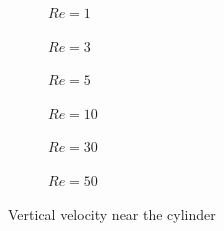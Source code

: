 \begin{figure}[h]
	\centering
	\begin{subfigure}{0.5\textwidth}
		\resizebox{1.1\textwidth}{!}{}
		\caption{$Re=1$}
	\end{subfigure}%
	\begin{subfigure}{0.5\textwidth}
		\resizebox{1.1\textwidth}{!}{}
		\caption{$Re=3$}
	\end{subfigure}
	\begin{subfigure}{0.5\textwidth}
		\resizebox{1.1\textwidth}{!}{}
		\caption{$Re=5$}
	\end{subfigure}%
	\begin{subfigure}{0.5\textwidth}
		\resizebox{1.1\textwidth}{!}{}
		\caption{$Re=10$}
	\end{subfigure}
	\begin{subfigure}{0.5\textwidth}
		\resizebox{1.1\textwidth}{!}{}
		\caption{$Re=30$}
	\end{subfigure}%
	\begin{subfigure}{0.5\textwidth}
		\resizebox{1.1\textwidth}{!}{}
		\caption{$Re=50$}
	\end{subfigure}
	\caption{Vertical velocity near the cylinder}
	\label{VerticalCylinder}
\end{figure}

